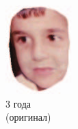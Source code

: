 \begin{figure}[t]
\centering
	\begin{subfigure}[t]{0.2\textwidth}
		\includegraphics[width=\textwidth]{ilaware_cover1.png}
		\caption{3 года \\ (оригинал)} 
	\end{subfigure}
	\begin{subfigure}[t]{0.2\textwidth}

\end{subfigure}
\end{figure}

